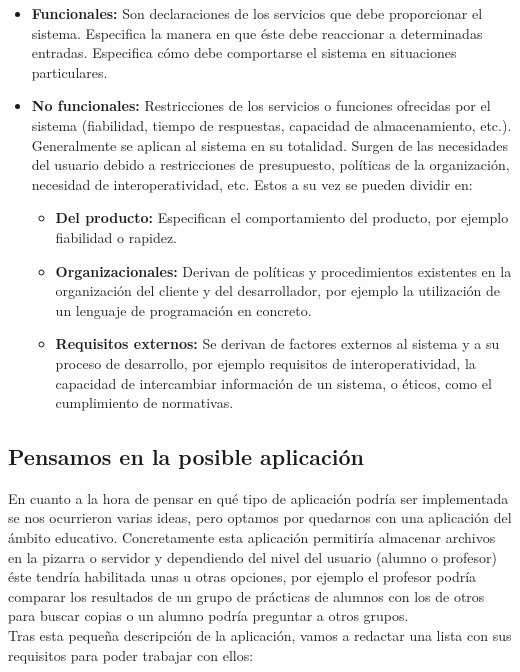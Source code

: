\begin{itemize}
	\item \textbf{Funcionales: }Son declaraciones de los servicios que debe proporcionar el sistema. Especifica la manera en que éste debe reaccionar a determinadas entradas. Especifica cómo debe comportarse el sistema en situaciones particulares.
	\item \textbf{No funcionales: } Restricciones de los servicios o funciones ofrecidas por el sistema (fiabilidad, tiempo de respuestas, capacidad de almacenamiento, etc.). Generalmente se aplican al sistema en su totalidad. Surgen de las necesidades del usuario debido a restricciones de presupuesto, políticas de la organización, necesidad de interoperatividad, etc. Estos a su vez se pueden dividir en:
	\begin{itemize}
		\item\textbf{Del producto:} Especifican el comportamiento del producto, por ejemplo fiabilidad o rapidez.
		\item\textbf{Organizacionales:} Derivan de políticas y procedimientos existentes en la organización del cliente y del desarrollador, por ejemplo la utilización de un lenguaje de programación en concreto.
		\item\textbf{Requisitos externos:} Se derivan de factores externos al sistema y a su proceso de desarrollo, por ejemplo requisitos de interoperatividad, la capacidad de intercambiar información de un sistema, o éticos, como el cumplimiento de normativas.
	\end{itemize}
\end{itemize}

\subsection{Pensamos en la posible aplicación}

En cuanto a la hora de pensar en qué tipo de aplicación podría ser implementada se nos ocurrieron varias ideas\cite{discusionaplicacion}, pero optamos por quedarnos con una aplicación del ámbito educativo. Concretamente esta aplicación permitiría almacenar archivos en la pizarra o servidor y dependiendo del nivel del usuario (alumno o profesor) éste tendría habilitada unas u otras opciones, por ejemplo el profesor podría comparar los resultados de un grupo de prácticas de alumnos con los de otros para buscar copias o un alumno podría preguntar a otros grupos.\\

Tras esta pequeña descripción de la aplicación, vamos a redactar una lista con sus requisitos para poder trabajar con ellos:


